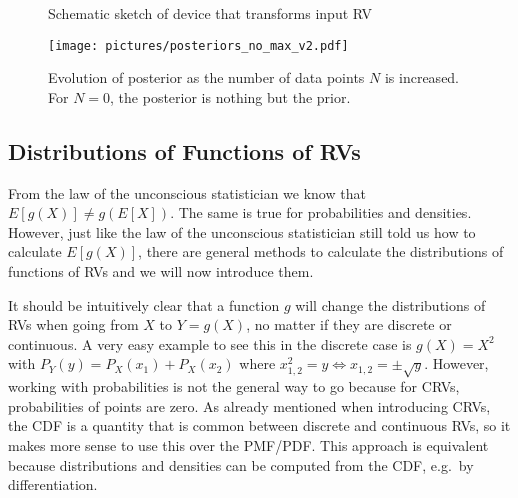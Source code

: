 \begin{figure}[t]
\centering


\caption{Schematic sketch of device that transforms input RV}
\label{fig:measure_device}
\end{figure}



\begin{figure}
\centering

\texttt{[image: pictures/posteriors\_no\_max\_v2.pdf]}

\caption{Evolution of posterior as the number of data points $N$ is increased. For $N = 0$, the posterior is nothing but the prior.}
\label{fig:posteriors}
\end{figure}



	\subsection{Distributions of Functions of RVs}
From the law of the unconscious statistician we know that $E[g(X)] \neq g(E[X])$. The same is true for probabilities and densities. However, just like the law of the unconscious statistician still told us how to calculate $E[g(X)]$, there are general methods to calculate the distributions of functions of RVs and we will now introduce them.


It should be intuitively clear that a function $g$ will change the distributions of RVs when going from $X$ to $Y = g(X)$, no matter if they are discrete or continuous. A very easy example to see this in the discrete case is $g(X) = X^2$ with $P_Y(y) = P_X(x_1) + P_X(x_2)$ where $x_{1, 2}^2 = y \Leftrightarrow x_{1, 2} = \pm \sqrt{y}$. However, working with probabilities is not the general way to go because for CRVs, probabilities of points are zero. As already mentioned when introducing CRVs, the CDF is a quantity that is common between discrete and continuous RVs, so it makes more sense to use this over the PMF/PDF. This approach is equivalent because distributions and densities can be computed from the CDF, e.g.~by differentiation.


